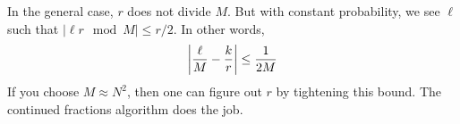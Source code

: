 In the general case, $r$ does not divide $M$. But with constant probability, we see $\ell$ such that $|\ell r \mod M| \leq r/2$.
In other words,
\[ \qty|\frac{\ell}{M} - \frac{k}{r}| \leq \frac{1}{2M} \]
If you choose $M \approx N^2$, then one can figure out $r$ by tightening this bound. The continued fractions algorithm does the job.